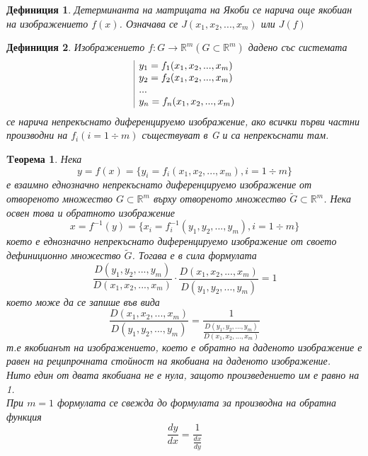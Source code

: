 \documentclass[a4paper,fleqn,12pt]{article}
\newtheorem{theorem}{Tеорема}[subsection]
\newtheorem{definition}{Дефиниция}[subsection]
\theoremstyle{definition}
\begin{document}
\begin{definition}
Детерминанта на матрицата на Якоби се нарича още якобиан на изображението $f(x)$. Означава се  $J(x_1, x_2, ..., x_m)$ или $J(f)$
\end{definition}

\begin{definition}
Изображението $f: G \to \mathbb{R}^m (G \subset \mathbb{R}^m) $ дадено със системата 
$$\begin{array}{|l@{}}
y_1 = f_1(x_1, x_2, ..., x_m) \\
y_2 = f_2(x_1, x_2, ..., x_m) \\
...\\
y_n = f_n(x_1, x_2, ..., x_m) 
\end{array}$$
се нарича непрекъснато диференцируемо изображение, ако всички първи частни производни на $f_i (i = 1 \div m)$ съществуват в G и са непрекъснати там. 
\end{definition}

\begin{theorem}
Нека 
$$y = f(x) = \{y_i = f_i(x_1, x_2, ..., x_m), i = 1 \div m \}$$
е взаимно еднозначно непрекъснато диференцируемо изображение от отвореното множество $G \subset \mathbb{R}^m$ върху отвореното множество $ \widetilde{G} \subset \mathbb{R}^m$. Нека освен това и обратното изображение
$$x = f^{-1}(y) = \{x_i = f_i  ^{-1} (y_1, y_2, ..., y_m), i = 1 \div m\}$$
което е еднозначно непрекъснато диференцируемо изображение от своето дефиниционно множество $ \widetilde{G}$.  Тогава е в сила формулата 
$$\frac{D(y_1, y_2, ..., y_m)}{D(x_1, x_2, ..., x_m)} \cdot  \frac{D(x_1, x_2, ..., x_m)}{D(y_1, y_2, ..., y_m)} = 1$$
което може да се запише във вида
$$\frac{D(x_1, x_2, ..., x_m)}{D(y_1, y_2, ..., y_m)} = \frac{1}{\frac{D(y_1, y_2, ..., y_m)}{D(x_1, x_2, ..., x_m)}} $$
т.е якобианът на изображението, което е обратно на даденото изображение е равен  на реципрочната стойност на якобиана на даденото изображение.\\
Нито един от двата якобиана не е нула, защото произведението им е равно на 1. \\
При $m = 1$ формулата се свежда до формулата за производна на обратна функция
$$\frac{dy}{dx} = \frac{1}{\frac{dx}{dy}}$$

\end{theorem}
\end{document}
